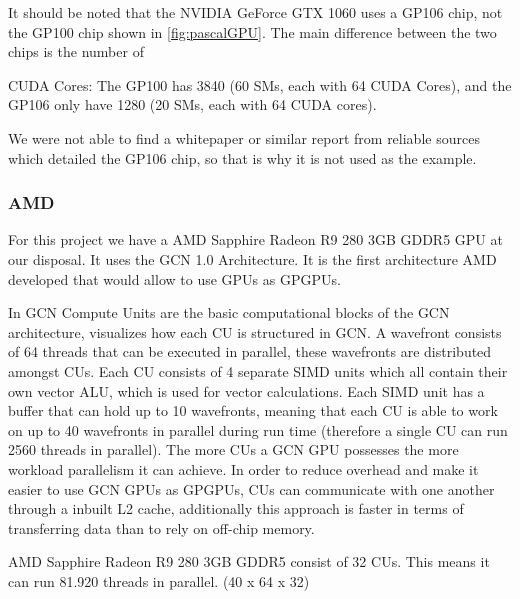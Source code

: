 It should be noted that the NVIDIA GeForce GTX 1060 uses a GP106 chip, not the GP100 chip shown in \cref{fig:pascalGPU}. 
The main difference between the two chips is the number of {CUDA Cores: The GP100 has 3840 (60 \glspl{SM}, each with 64 CUDA Cores), and the GP106 only have 1280 (20 \glspl{SM}, each with 64 CUDA cores).

We were not able to find a whitepaper or similar report from reliable sources which detailed the GP106 chip, so that is why it is not used as the example. 


\subsubsection{AMD}
For this project we have a AMD Sapphire Radeon R9 280 3GB GDDR5 \gls{GPU} at our disposal. It uses the \gls{GCN} 1.0 Architecture.
It is the first architecture AMD developed that would allow to use \glspl{GPU} as \glspl{GPGPU}.



In \gls{GCN} Compute Units are the basic computational blocks of the \gls{GCN} architecture,  visualizes how each \gls{CU} is structured in \gls{GCN}.
A wavefront consists of 64 threads that can be executed in parallel, these wavefronts are distributed amongst \gls{CU}s. 
Each \gls{CU} consists of 4 separate SIMD units which all contain their own vector ALU, which is used for vector calculations.  
Each SIMD unit has a buffer that can hold up to 10 wavefronts, meaning that each \gls{CU} is able to work on up to 40 wavefronts in parallel during run time (therefore a single CU can run 2560 threads in parallel). 
The more \glspl{CU} a \gls{GCN} \gls{GPU} possesses the more workload parallelism it can achieve.
In order to reduce overhead and make it easier to use \gls{GCN} \glspl{GPU} as \glspl{GPGPU}, \glspl{CU} can communicate with one another through a inbuilt L2 cache, additionally this approach is faster in terms of transferring data than to rely on off-chip memory.

AMD Sapphire Radeon R9 280 3GB GDDR5 consist of 32 \glspl{CU}.
This means it can run 81.920 threads in parallel. (40 x 64 x 32)



}
